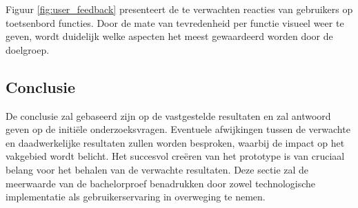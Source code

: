 Figuur \ref{fig:user_feedback} presenteert de te verwachten reacties van gebruikers op toetsenbord functies. Door de mate van tevredenheid per functie visueel weer te geven, wordt duidelijk welke aspecten het meest gewaardeerd worden door de doelgroep.

\subsection{Conclusie}

De conclusie zal gebaseerd zijn op de vastgestelde resultaten en zal antwoord geven op de initiële onderzoeksvragen. Eventuele afwijkingen tussen de verwachte en daadwerkelijke resultaten zullen worden besproken, waarbij de impact op het vakgebied wordt belicht. Het succesvol creëren van het prototype is van cruciaal belang voor het behalen van de verwachte resultaten. Deze sectie zal de meerwaarde van de bachelorproef benadrukken door zowel technologische implementatie als gebruikerservaring in overweging te nemen.

